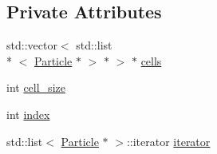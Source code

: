 \subsection*{Private Attributes}
\begin{DoxyCompactItemize}
\item 
std\-::vector$<$ std\-::list\\*
$<$ \hyperlink{classParticle}{Particle} $\ast$ $>$ $\ast$ $>$ $\ast$ \hyperlink{classutils_1_1LCOuterParticleIterator_a2a9cde56a9eab6ba0dad00cfad74ff01}{cells}
\item 
int \hyperlink{classutils_1_1LCOuterParticleIterator_aa4df9b61c19d57586aa8a24433df3bb9}{cell\-\_\-size}
\item 
int \hyperlink{classutils_1_1LCOuterParticleIterator_a54059f42735afc424f37d05cb5a40a98}{index}
\item 
std\-::list$<$ \hyperlink{classParticle}{Particle} $\ast$ $>$\-::iterator \hyperlink{classutils_1_1LCOuterParticleIterator_ab01cb9c518e6f5e97b4b99b8a1af88e5}{iterator}
\end{DoxyCompactItemize}


